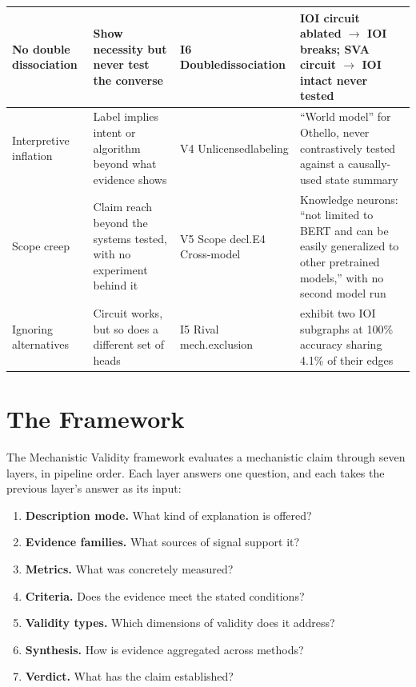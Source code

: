 \documentclass{article}
\begin{document}
\begin{table}[H]
\begin{tabular}{@{}l>{\raggedright\arraybackslash}p{3.2cm}>{\raggedright\arraybackslash}p{2.8cm}>{\raggedright\arraybackslash}p{4.0cm}@{}}
No double dissociation & Show necessity but never test the converse & I6 Double\newline dissociation & IOI circuit ablated $\to$ IOI breaks; SVA circuit $\to$ IOI intact never tested \\
\midrule
Interpretive inflation & Label implies intent or algorithm beyond what evidence shows & V4 Unlicensed\newline labeling & ``World model'' for Othello, never contrastively tested against a causally-used state summary \\
\midrule
Scope creep & Claim reach beyond the systems tested, with no experiment behind it & V5 Scope decl.\newline E4 Cross-model & Knowledge neurons: ``not limited to BERT and can be easily generalized to other pretrained models,'' with no second model run \\
\midrule
Ignoring alternatives & Circuit works, but so does a different set of heads & I5 Rival mech.\newline exclusion & \citet{chen2026circuits} exhibit two IOI subgraphs at 100\% accuracy sharing 4.1\% of their edges \\
\bottomrule
\end{tabular}
\end{table}
\endgroup


\section{The Framework}
\label{sec:framework}

The Mechanistic Validity framework evaluates a mechanistic claim through seven layers, in pipeline order. Each layer answers one question, and each takes the previous layer's answer as its input:
\begin{enumerate}[nosep,leftmargin=*]
\item \textbf{Description mode.} What kind of explanation is offered?
\item \textbf{Evidence families.} What sources of signal support it?
\item \textbf{Metrics.} What was concretely measured?
\item \textbf{Criteria.} Does the evidence meet the stated conditions?
\item \textbf{Validity types.} Which dimensions of validity does it address?
\item \textbf{Synthesis.} How is evidence aggregated across methods?
\item \textbf{Verdict.} What has the claim established?
\end{enumerate} 
\end{document}
